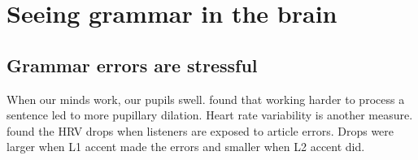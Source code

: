 \chapter{Seeing grammar in the brain}

\section{Grammar errors are stressful}

When our minds work, our pupils swell.
\citet{Just1993} found that working harder to process a sentence led to more pupillary dilation.
Heart rate variability is another measure. \citet{Divjak2024a} found the HRV drops when listeners are exposed to article errors. Drops were larger when L1 accent made the errors and smaller when L2 accent did.
